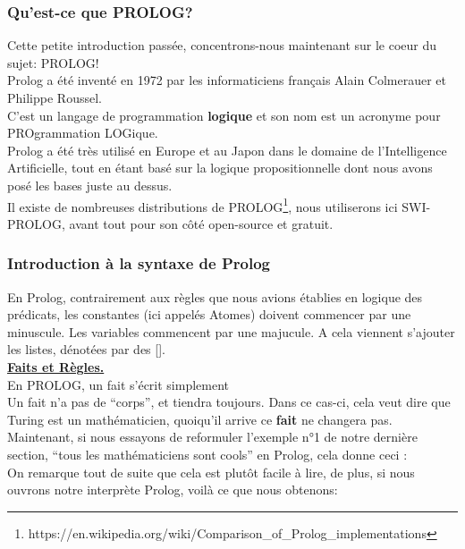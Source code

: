 \documentclass[a4paper, 12pt]{article}
\numberwithin{equation}{subsection}
\begin{document}
\subsubsection{Qu'est-ce que PROLOG?}
Cette petite introduction passée, concentrons-nous maintenant sur le coeur du sujet: PROLOG! \\

Prolog a été inventé en 1972 par les informaticiens français Alain Colmerauer et Philippe Roussel. \\
C'est un langage de programmation {\bf logique} et son nom est un acronyme pour PROgrammation LOGique. \\
Prolog a été très utilisé en Europe et au Japon dans le domaine de l'Intelligence Artificielle, tout en étant basé sur la logique propositionnelle dont nous avons posé les bases juste au dessus. \\
Il existe de nombreuses distributions de PROLOG\footnote{https://en.wikipedia.org/wiki/Comparison\_of\_Prolog\_implementations}, nous utiliserons ici SWI-PROLOG, avant tout pour son côté open-source et gratuit.
\subsubsection{Introduction à la syntaxe de Prolog}
En Prolog, contrairement aux règles que nous avions établies en logique des prédicats, les constantes (ici appelés Atomes) doivent commencer par une minuscule. Les variables commencent par une majucule. A cela viennent s'ajouter les listes, dénotées par des []. \\

\underline{{\bf Faits et Règles.}} \\[0.2cm]
En PROLOG, un fait s'écrit simplement \\[0.2cm]

Un fait n'a pas de ``corps'', et tiendra toujours. Dans ce cas-ci, cela veut dire que Turing est un mathématicien, quoiqu'il arrive ce {\bf fait} ne changera pas. \\

Maintenant, si nous essayons de reformuler l'exemple n°1 de notre dernière section, ``tous les mathématiciens sont cools'' en Prolog, cela donne ceci : \\[0.2cm]

On remarque tout de suite que cela est plutôt facile à lire, de plus, si nous ouvrons notre interprète Prolog, voilà ce que nous obtenons: \\[0.2cm]
\end{document}
